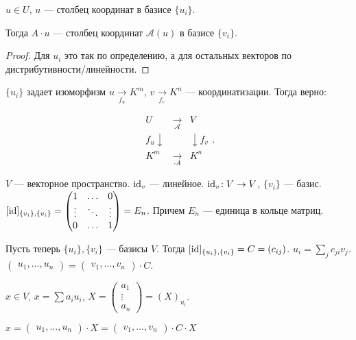 \begin{statement}
    $u \in U$,  $u$ --- столбец координат в базисе  $\{u_i\}$.

    Тогда  $A \cdot u$ --- столбец координат  $\mathcal{A}(u)$ в базисе  $\{v_i\}$.
\end{statement}
\begin{proof}
    Для $u_i$ это так по определению, а для остальных векторов по дистрибутивности/линейности.
\end{proof}
\begin{remark}
    $\{u_i\}$ задает изоморфизм  $u \xrightarrow[f_u]{} K^m$,  $v \xrightarrow[f_v]{} K^n$ --- координатизации. Тогда верно:

    \[
    \begin{matrix}
        U & \xrightarrow[\mathcal{A}]{} & V \\
        f_u \downarrow & & \downarrow f_v \\
        K^m & \xrightarrow[\cdot A]{} & K^n
    \end{matrix}
    .\]
\end{remark}

$V$ --- векторное пространство.  $\operatorname{id}_v$ --- линейное.  $\operatorname{id}_v\!: V \to V$,  $\{v_i\}$ --- базис.  $[\operatorname{id}]_{\{v_i\}, \{v_i\}} = \begin{pmatrix} 1 & \ldots & 0 \\ \vdots & \ddots & \vdots \\ 0 & \ldots & 1 \end{pmatrix} = E_n$. Причем  $E_n$ --- единица в кольце матриц.


Пусть теперь $\{u_i\}, \{v_i\}$ --- базисы  $V$. Тогда  $[\operatorname{id}]_{\{u_i\}, \{v_i\}} = C = (c_{ij})$. $u_i = \sum_j c_{ji} v_{j}$.  $\begin{pmatrix} u_1, \ldots, u_n\end{pmatrix} = \begin{pmatrix}v_1, \ldots, v_n \end{pmatrix} \cdot C$.

$x\in V$,  $x = \sum a_i u_i$,  $X = \begin{pmatrix} a_1 \\ \vdots \\ a_n \end{pmatrix} = (X)_{u_i}$.

$x = \begin{pmatrix} u_1, \ldots, u_n\end{pmatrix} \cdot X = \begin{pmatrix}v_1, \ldots, v_n \end{pmatrix} \cdot C \cdot X$

